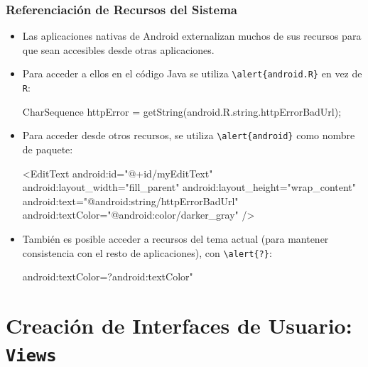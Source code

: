 \documentclass[hyperref={pdfpagelabels=true},ucs]{beamer}
\begin{document}
\begin{frame}[fragile,shrink=10]
\frametitle{Referenciación de Recursos del Sistema}

\begin{itemize}
\item Las aplicaciones nativas de Android externalizan muchos de sus
  recursos para que sean accesibles desde otras aplicaciones.
\item Para acceder a ellos en el código Java se utiliza
  \Verb|\alert{android.R}| en vez de \verb|R|:
\begin{tiny}
\begin{block}{}
\begin{java}
CharSequence httpError = getString(android.R.string.httpErrorBadUrl);
\end{java}
\end{block}
\end{tiny}

\item Para acceder desde otros recursos, se utiliza
  \Verb|\alert{android}| como nombre de paquete:
\begin{tiny}
\begin{block}{}
\begin{xml}
<EditText
   android:id="@+id/myEditText"
   android:layout_width="fill_parent"
   android:layout_height="wrap_content"
   android:text="@android:string/httpErrorBadUrl"
   android:textColor="@android:color/darker_gray"
/>
\end{xml}
\end{block}
\end{tiny}

\item También es posible acceder a recursos del tema actual (para
  mantener consistencia con el resto de aplicaciones), con
  \Verb|\alert{?}|:
\begin{tiny}
\begin{block}{}
\begin{xml}
   android:textColor=?android:textColor"
\end{xml}
\end{block}
\end{tiny}

\end{itemize}

\end{frame}


\section{Creación de Interfaces de Usuario: \texttt{Views}}
\end{document}
